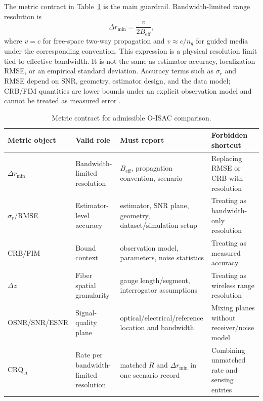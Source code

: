 \documentclass[letterpaper,journal]{IEEEtran}
\begin{document}
The metric contract in Table~\ref{tab:ii2} is the main guardrail. Bandwidth-limited range resolution is
\begin{equation}
    \Delta r_{\min}=\frac{v}{2B_{\mathrm{eff}}},
    \label{eq:range_resolution}
\end{equation}
where \(v=c\) for free-space two-way propagation and \(v\approx c/n_g\) for guided media under the corresponding convention. This expression is a physical resolution limit tied to effective bandwidth. It is not the same as estimator accuracy, localization RMSE, or an empirical standard deviation. Accuracy terms such as \(\sigma_r\) and RMSE depend on SNR, geometry, estimator design, and the data model; CRB/FIM quantities are lower bounds under an explicit observation model and cannot be treated as measured error \cite{O_ISAC_050,O_ISAC_056,O_ISAC_061,O_ISAC_062}.

\begin{table}[!t]
    \caption{Metric contract for admissible O-ISAC comparison.}
    \label{tab:ii2}
    \centering
    \scriptsize
    \setlength{\tabcolsep}{2.8pt}
    \renewcommand{\arraystretch}{1.08}
    \begin{tabularx}{\textwidth}{@{}p{2.15cm}p{2.15cm}p{2.7cm}X@{}}
        \toprule
        Metric object & Valid role & Must report & Forbidden shortcut \\
        \midrule
        $\Delta r_{\min}$ & Bandwidth-limited resolution & $B_{\mathrm{eff}}$, propagation convention, scenario & Replacing RMSE or CRB with resolution \\
        $\sigma_r$/RMSE & Estimator-level accuracy & estimator, SNR plane, geometry, dataset/simulation setup & Treating as bandwidth-only resolution \\
        CRB/FIM & Bound context & observation model, parameters, noise statistics & Treating as measured accuracy \\
        $\Delta z$ & Fiber spatial granularity & gauge length/segment, interrogator assumptions & Treating as wireless range resolution \\
        OSNR/SNR/ESNR & Signal-quality plane & optical/electrical/reference location and bandwidth & Mixing planes without receiver/noise model \\
        $\mathrm{CRQ}_{\Delta}$ & Rate per bandwidth-limited resolution & matched $R$ and $\Delta r_{\min}$ in one scenario record & Combining unmatched rate and sensing entries \\
        \bottomrule
    \end{tabularx}
\end{table}
\end{document}
